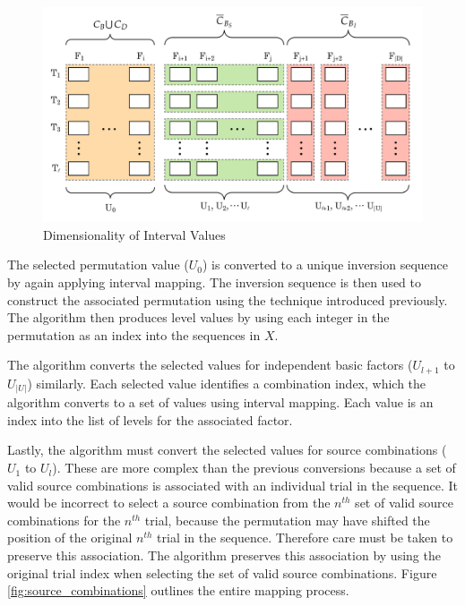 \begin{figure}[htb]
\centering
\centerline{\includegraphics[origin=c,width=12cm]{../figures/sequence-dimensions.png}}
\caption{Dimensionality of Interval Values}
\label{fig:sequence_dimensions}
\end{figure}

The selected permutation value ($U_0$) is converted to a unique inversion sequence by again applying interval mapping. The inversion sequence is then used to construct the associated permutation using the technique introduced previously. The algorithm then produces level values by using each integer in the permutation as an index into the sequences in $X$.

The algorithm converts the selected values for independent basic factors ($U_{l+1}$ to $U_{|U|}$) similarly. Each selected value identifies a combination index, which the algorithm converts to a set of values using interval mapping. Each value is an index into the list of levels for the associated factor. %

Lastly, the algorithm must convert the selected values for source combinations ($U_1$ to $U_l$). These are more complex than the previous conversions because a set of valid source combinations is associated with an individual trial in the sequence. It would be incorrect to select a source combination from the $n^{th}$ set of valid source combinations for the $n^{th}$ trial, because the permutation may have shifted the position of the original $n^{th}$ trial in the sequence. Therefore care must be taken to preserve this association. The algorithm preserves this association by using the original trial index when selecting the set of valid source combinations. Figure \ref{fig:source_combinations} outlines the entire mapping process.

